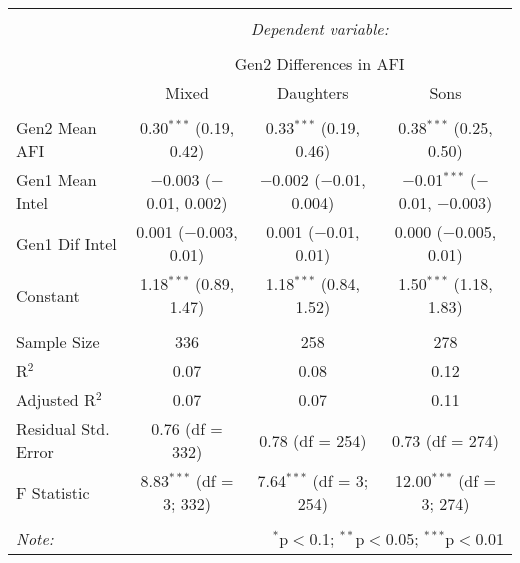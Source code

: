 
\begingroup 
\small 
\begin{tabular}{@{\extracolsep{1pt}}lccc} 
\\[-1.8ex]\hline 
\hline \\[-1.8ex] 
 & \multicolumn{3}{c}{\textit{Dependent variable:}} \\ 
\cline{2-4} 
\\[-1.8ex] & \multicolumn{3}{c}{Gen2 Differences in AFI} \\ 
 & Mixed & Daughters & Sons \\ 
\hline \\[-1.8ex] 
 Gen2 Mean AFI & 0.30$^{***}$ (0.19, 0.42) & 0.33$^{***}$ (0.19, 0.46) & 0.38$^{***}$ (0.25, 0.50) \\ 
  Gen1 Mean Intel & $-$0.003 ($-$0.01, 0.002) & $-$0.002 ($-$0.01, 0.004) & $-$0.01$^{***}$ ($-$0.01, $-$0.003) \\ 
  Gen1 Dif Intel & 0.001 ($-$0.003, 0.01) & 0.001 ($-$0.01, 0.01) & 0.000 ($-$0.005, 0.01) \\ 
  Constant & 1.18$^{***}$ (0.89, 1.47) & 1.18$^{***}$ (0.84, 1.52) & 1.50$^{***}$ (1.18, 1.83) \\ 
 \hline \\[-1.8ex] 
Sample Size & 336 & 258 & 278 \\ 
R$^{2}$ & 0.07 & 0.08 & 0.12 \\ 
Adjusted R$^{2}$ & 0.07 & 0.07 & 0.11 \\ 
Residual Std. Error & 0.76 (df = 332) & 0.78 (df = 254) & 0.73 (df = 274) \\ 
F Statistic & 8.83$^{***}$ (df = 3; 332) & 7.64$^{***}$ (df = 3; 254) & 12.00$^{***}$ (df = 3; 274) \\ 
\hline 
\hline \\[-1.8ex] 
\textit{Note:}  & \multicolumn{3}{r}{$^{*}$p$<$0.1; $^{**}$p$<$0.05; $^{***}$p$<$0.01} \\ 
\end{tabular} 
\endgroup 
